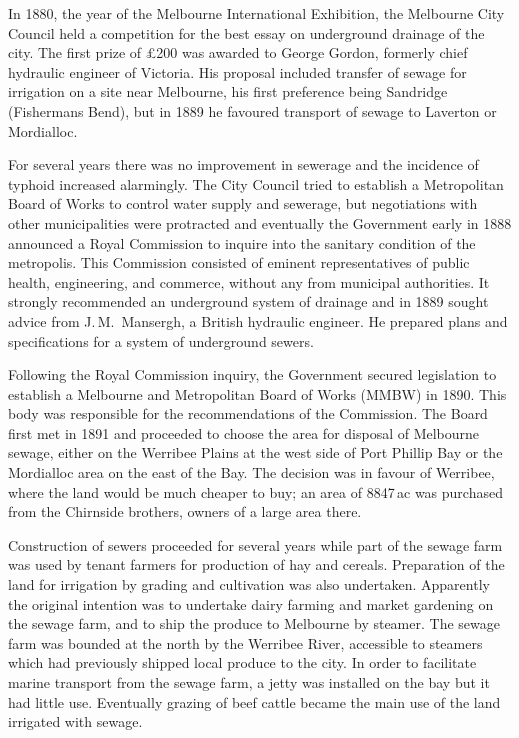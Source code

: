 In 1880, the year of the Melbourne International Exhibition, the
Melbourne City Council held a competition for the best essay on
underground drainage of the city.  The first prize of \pounds200 was
awarded to George Gordon, formerly chief hydraulic engineer of
Victoria.  His proposal included transfer of sewage for irrigation on
a site near Melbourne, his first preference being Sandridge
(Fishermans Bend), but in 1889 he favoured transport of sewage to
Laverton or Mordialloc.

For several years there was no improvement in sewerage and the
incidence of typhoid increased alarmingly.  The City Council tried to
establish a Metropolitan Board of Works to control water supply and
sewerage, but negotiations with other municipalities were protracted
and eventually the Government early in 1888 announced a Royal
Commission to inquire into the sanitary condition of the
metropolis.  This Commission consisted of
eminent representatives of public health, engineering, and commerce,
without any from municipal authorities.  It strongly recommended an
underground system of drainage and in 1889 sought advice from
J.\,M.~Mansergh, a British hydraulic engineer.  He prepared plans and
specifications for a system of underground sewers.

Following the Royal Commission inquiry, the Government secured
legislation to establish a Melbourne and Metropolitan Board of Works
(MMBW) in 1890.  This body was responsible for the recommendations of
the Commission.  The Board first met in 1891 and proceeded to choose
the area for disposal of Melbourne sewage, either on the Werribee
Plains at the west side of Port Phillip Bay or the Mordialloc area on
the east of the Bay.  The decision was in favour of Werribee, where
the land would be much cheaper to buy; an area of 8847\,ac was
purchased from the Chirnside brothers, owners of a large area
there.

Construction of sewers proceeded for several years while part of the
sewage farm was used by tenant farmers for production of hay and
cereals.  Preparation of the land for
irrigation by grading and cultivation was also undertaken.  Apparently
the original intention was to undertake dairy farming and market
gardening on the sewage farm, and to ship the produce to Melbourne by
steamer. The sewage farm was bounded at the
north by the Werribee River, accessible to steamers which had
previously shipped local produce to the city.  In order to facilitate
marine transport from the sewage farm, a jetty was installed on the
bay but it had little use.  Eventually grazing of beef cattle became
the main use of the land irrigated with sewage.

